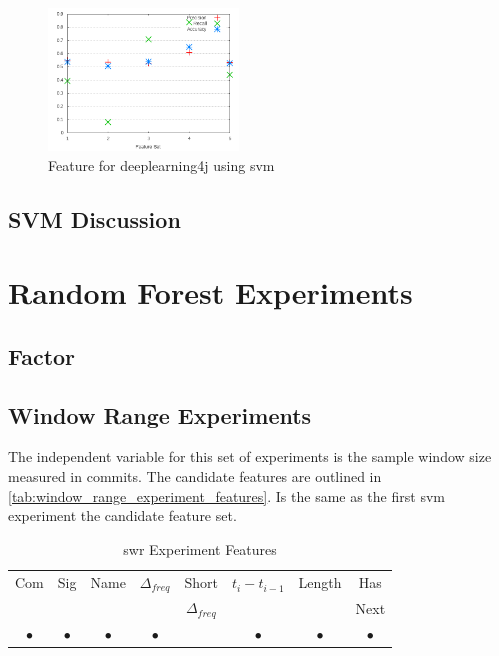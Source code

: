 \begin{figure}[h]
    \centering
        \includegraphics[width=0.45\textwidth]{images/svm/test_3/deeplearning4j_sample_range}
    \caption{Feature for deeplearning4j using \gls{svm}}
    \label{fig:test_3_deeplearning4j_svm}
\end{figure}


\subsection{SVM Discussion}
\label{subsec:svm_discussion}

\section{Random Forest Experiments}
\label{sec:rf_experiments}

\subsection{Factor}

\subsection{Window Range Experiments}
\label{sec:rf_swr_experiment}

The independent variable for this set of experiments is the sample window size measured in commits. The candidate features are outlined in \autoref{tab:window_range_experiment_features}. Is the same as the first \gls{svm} experiment the candidate feature set.

\begin{table}[h]
\begin{center}

    \begin{tabular}{|c|c|c|c|c|c|c|c|}
        \hline
        Com & Sig & Name & $\Delta_{freq}$ & Short & $t_{i} - t_{i-1}$ & Length & Has \\
         & & & & $\Delta_{freq}$ & & & Next \\ \hline
        $\bullet$ & $\bullet$ & $\bullet$ & $\bullet$ & & $\bullet$ & $\bullet$ & $\bullet$ \\ \hline
    \end{tabular}
    \caption{\gls{swr} Experiment Features}
    \label{tab:rf_window_range_experiment_features}
\end{center}

\end{table}

